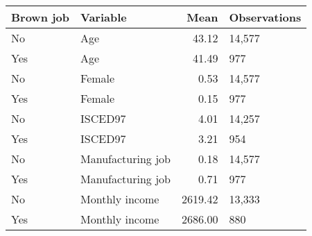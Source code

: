 \begin{table}[!h]
\centering
\begin{tabular}[t]{llrl}
\toprule
Brown job & Variable & Mean & Observations\\
\midrule
No & Age & 43.12 & 14,577\\
Yes & Age & 41.49 & 977\\
No & Female & 0.53 & 14,577\\
Yes & Female & 0.15 & 977\\
No & ISCED97 & 4.01 & 14,257\\
Yes & ISCED97 & 3.21 & 954\\
No & Manufacturing job & 0.18 & 14,577\\
Yes & Manufacturing job & 0.71 & 977\\
No & Monthly income & 2619.42 & 13,333\\
Yes & Monthly income & 2686.00 & 880\\
\bottomrule
\end{tabular}
\end{table}
